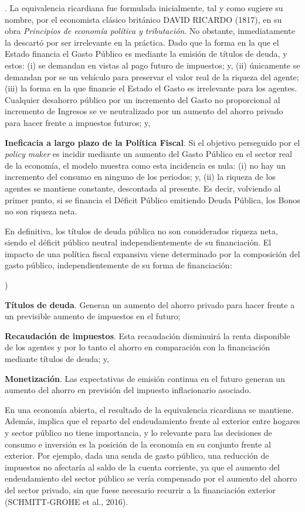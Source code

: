 \documentclass[10pt,a4paper]{article}
\newcounter{alphaitem}
\newcounter{numitem}
\newenvironment{la}
      {\begin{list}{\alph{alphaitem})}{%
          \usecounter{alphaitem}%
          \setlength{\leftmargin}{1cm}%
          \setlength{\parskip}{3pt}%
          \setlength{\itemsep}{0pt}%
          \setlength{\parsep}{0pt}%
      }}
      {\end{list}}
\newenvironment{lnum}
      {\begin{list}{\arabic{numitem}.}{%
          \usecounter{numitem}%
          \setlength{\leftmargin}{1cm}%
          \setlength{\parskip}{3pt}%
          \setlength{\itemsep}{0pt}%
          \setlength{\parsep}{0pt}%
      }}
      {\end{list}}
\begin{document}
\begin{lnum}
{    La equivalencia ricardiana fue formulada inicialmente, tal y como sugiere su nombre, por el economista clásico británico DAVID RICARDO (1817), en su obra \textit{Principios de economía política y tributación}. No obstante, inmediatamente la descartó por ser irrelevante en la práctica.
    } Dado que la forma en la que el Estado financia el Gasto Público es mediante la emisión de títulos de deuda, y estos: (i) se demandan en vistas al pago futuro de impuestos; y, (ii) únicamente se demandan por se un vehículo para preservar el valor real de la riqueza del agente; (iii) la forma en la que financie el Estado el Gasto es irrelevante para los agentes. Cualquier desahorro público por un incremento del Gasto no proporcional al incremento de Ingresos se ve neutralizado por un aumento del ahorro privado para hacer frente a impuestos futuros; y,
    \item \textbf{Ineficacia a largo plazo de la Política Fiscal}. Si el objetivo perseguido por el \textit{policy maker} es incidir mediante un aumento del Gasto Público en el sector real de la economía, el modelo muestra como esta incidencia es nula: (i) no hay un incremento del consumo en ninguno de los periodos; y, (ii) la riqueza de los agentes se mantiene constante, descontada al presente. Es decir, volviendo al primer punto, si se financia el Déficit Público emitiendo Deuda Pública, los Bonos no son riqueza neta. 
\end{lnum}

En definitiva, los títulos de deuda pública no son considerados riqueza neta, siendo el déficit público neutral independientemente de su financiación. El impacto de una política fiscal expansiva viene determinado por la composición del gasto público, independientemente de su forma de financiación:
\begin{la}
    \item \textbf{Títulos de deuda}. Generan un aumento del ahorro privado para hacer frente a un previsible aumento de impuestos en el futuro;
    \item \textbf{Recaudación de impuestos}. Esta recaudación disminuirá la renta disponible de los agentes y por lo tanto el ahorro en comparación con la financiación mediante títulos de deuda; y,
    \item \textbf{Monetización}. Las expectativas de emisión continua en el futuro generan un aumento del ahorro en previsión del impuesto inflacionario asociado.
\end{la}

En una economía abierta, el resultado de la equivalencia ricardiana se mantiene. Además, implica que el reparto del endeudamiento frente al exterior entre hogares y sector público no tiene importancia, y lo relevante para las decisiones de consumo e inversión es la posición de la economía en su conjunto frente al exterior. Por ejemplo, dada una senda de gasto público, una reducción de impuestos no afectaría al saldo de la cuenta corriente, ya que el aumento del endeudamiento del sector público se vería compensado por el aumento del ahorro del sector privado, sin que fuese necesario recurrir a la financiación exterior (SCHMITT-GROHE et al., 2016).
\end{document}
